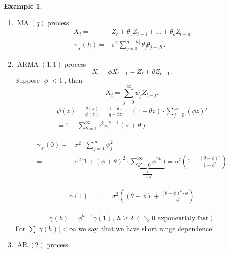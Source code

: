 \documentclass[12pt,a4paper, notitlepage]{book}
\theoremstyle{definition} %
\newtheorem{example}{Example}[chapter]
\theoremstyle{plain} %
\DeclareMathOperator{\Arma}{ARMA}
\DeclareMathOperator{\Ar}{AR}
\DeclareMathOperator{\Ma}{MA}
\begin{document}
\begin{example}
\begin{enumerate}[alph]
\item
$ \Ma(q) $ process 
\begin{align*} 
 X_t = & Z_t + \theta_1  Z_{t-1} + \ldots + \theta_q Z_{t-q} \\
\gamma _X(h) = & \sigma ^2 \sum _{j=0} ^{q- |h| } \theta_j \theta_{j+ |h| } . 
\end{align*}


\item $ \Arma(1,1) $ process 
\[ X_t - \phi X_{t-1} = Z_t + \theta Z_{t-1} . \]
Suppose $ | \phi | < 1 $ , then 
\[ X_t = \sum_{j=0} ^{\infty} \psi _j Z_{t-j} . \]
\begin{align*}
 \psi (z) = \frac{ \theta(z) }{ \phi(z)} = \frac{ 1 + \theta z}{ q - \phi z} = ( 1 + \theta z) \cdot \sum _{j=0} ^{\infty} ( \phi z) ^j \\
= 1 + \sum _{k=1} ^{\infty} z^k \phi ^{k-1} (\phi + \theta) . 
\end{align*}

\begin{align*} 
\gamma _X(0) = & \sigma ^2 \cdot \sum _{j=0} ^ {\infty} \psi _j ^2 \\
= & \sigma ^2  (1 + ( \phi + \theta ) ^2 \cdot \underbrace{ \sum_{k'=0} ^{\infty} \phi ^{2k'} \big) } _{ \frac{1}{1- \phi ^2} } = 
\sigma ^2 \left( 1 + \frac{ ( \theta + \phi)^2}{1 - \phi ^2 } \right) 
\end{align*}

\begin{align*} 
\gamma(1) = \ldots = \sigma ^2 \left( (\theta + \phi ) + \frac{ ( \theta + \phi) ^2 \cdot \phi }{ 1 - \phi ^2 } \right) 
\end{align*}

\begin{align*}
\gamma(h) = \phi ^{h-1} \gamma(1) , \; h \geq 2  \; ( \searrow 0 \text{ exponentialy fast}) 
\end{align*}
For $ \sum | \gamma (h) | < \infty $ we say, that we have short range dependence!

\item $ \Ar(2) $ process 


\end{enumerate}
\end{example}
\end{document}
